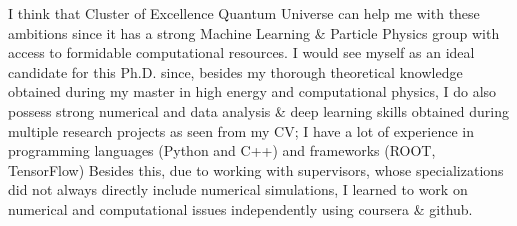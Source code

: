 \documentclass[11pt, a4paper]{awesome-cv}
\begin{document}
\begin{cvletter}
I think that Cluster of Excellence Quantum Universe can help me with these ambitions since it has a strong Machine Learning \& Particle Physics group with access to formidable computational resources.
I would see myself as an ideal candidate for this Ph.D. since, besides my thorough theoretical knowledge obtained during my master in high energy and computational physics, I do also possess strong numerical and data analysis \& deep learning skills obtained during multiple research projects as seen from my CV; I have a lot of experience in programming languages (Python and C++) and frameworks (ROOT, TensorFlow) Besides this, due to working with supervisors, whose specializations did not always directly include numerical simulations, I learned to work on numerical and computational issues independently using coursera \& github.

\end{cvletter}



\makeletterclosing
\end{document}

